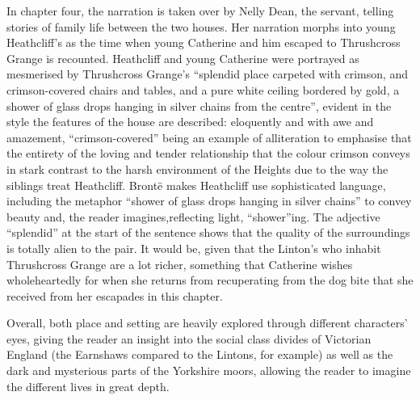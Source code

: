 \documentclass[a4paper,12pt]{article}
\begin{document}
In chapter four, the narration is taken over by Nelly Dean, the servant, telling stories of family life between the two houses. Her narration morphs into young Heathcliff's as the time when young Catherine and him escaped to Thrushcross Grange is recounted. Heathcliff and young Catherine were portrayed as mesmerised by Thrushcross Grange's ``splendid place carpeted with crimson, and crimson-covered chairs and tables, and a pure white ceiling bordered by gold, a shower of glass drops hanging in silver chains from the centre'', evident in the style the features of the house are described: eloquently and with awe and amazement, ``crimson-covered'' being an example of alliteration to emphasise that the entirety of the loving and tender relationship that the colour crimson conveys in stark contrast to the harsh environment of the Heights due to the way the siblings treat Heathcliff. Bront\"{e} makes Heathcliff use sophisticated language, including the metaphor ``shower of glass drops hanging in silver chains'' to convey beauty and, the reader imagines,reflecting light, ``shower''ing. The adjective ``splendid'' at the start of the sentence shows that the quality of the surroundings is totally alien to the pair. It would be, given that the Linton's who inhabit Thrushcross Grange are a lot richer, something that Catherine wishes wholeheartedly for when she returns from recuperating from the dog bite that she received from her escapades in this chapter. 

Overall, both place and setting are heavily explored through different characters' eyes, giving the reader an insight into the social class divides of Victorian England (the Earnshaws compared to the Lintons, for example) as well as the dark and mysterious parts of the Yorkshire moors, allowing the reader to imagine the different lives in great depth.
\end{document}
